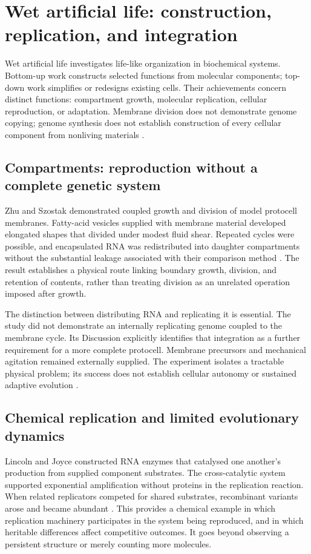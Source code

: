 \section{Wet artificial life: construction, replication, and integration}
\label{sec:wet-life}

Wet artificial life investigates life-like organization in biochemical systems.
Bottom-up work constructs selected functions from molecular components;
top-down work simplifies or redesigns existing cells. Their achievements concern
distinct functions: compartment growth, molecular replication, cellular
reproduction, or adaptation. Membrane division does not demonstrate genome
copying; genome synthesis does not establish construction of every cellular
component from nonliving materials
\citep{wetZhu2009,wetGibson2010,wetHutchison2016}.

\subsection{Compartments: reproduction without a complete genetic system}

Zhu and Szostak demonstrated coupled growth and division of model protocell
membranes. Fatty-acid vesicles supplied with membrane material developed
elongated shapes that divided under modest fluid shear. Repeated cycles were
possible, and encapsulated RNA was redistributed into daughter compartments
without the substantial leakage associated with their comparison method
\citep{wetZhu2009}. The result establishes a physical route linking boundary
growth, division, and retention of contents, rather than treating division as an
unrelated operation imposed after growth.

The distinction between distributing RNA and replicating it is essential.
The study did not demonstrate an internally replicating genome coupled to the
membrane cycle. Its Discussion explicitly identifies that integration as a
further requirement for a more complete protocell. Membrane precursors and
mechanical agitation remained externally supplied. The experiment isolates a
tractable physical problem; its success does not establish cellular autonomy
or sustained adaptive evolution \citep{wetZhu2009}.

\subsection{Chemical replication and limited evolutionary dynamics}

Lincoln and Joyce constructed RNA enzymes that catalysed one another's
production from supplied component substrates. The cross-catalytic system
supported exponential amplification without proteins in the replication
reaction. When related replicators competed for shared substrates, recombinant
variants arose and became abundant \citep{wetLincoln2009}. This provides a
chemical example in which replication machinery participates in the system
being reproduced, and in which heritable differences affect competitive
outcomes. It goes beyond observing a persistent structure or merely counting
more molecules.

